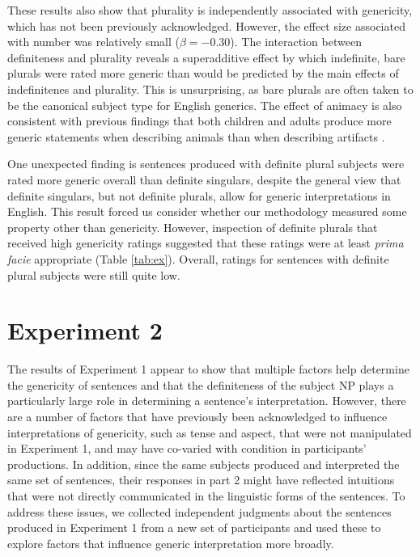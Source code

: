 \documentclass[10pt,letterpaper]{article}
\begin{document}
These results also show that plurality is independently associated with genericity, which has not been previously acknowledged. However, the effect size associated with number was relatively small (\(\beta = -0.30\)). The interaction between definiteness and plurality reveals a superadditive effect by which indefinite, bare plurals were rated more generic than would be predicted by the main effects of indefinitenes and plurality. This is unsurprising, as bare plurals are often taken to be the canonical subject type for English generics. The effect of animacy is also consistent with previous findings that both children and adults produce more generic statements when describing animals than when describing artifacts \cite{Brandone:2009}.

One unexpected finding is sentences produced with definite plural subjects were rated more generic overall than definite singulars, despite the general view that definite singulars, but not definite plurals, allow for generic interpretations in English. This result forced us consider whether our methodology measured some property other than genericity. However, inspection of definite plurals that received high genericity ratings suggested that these ratings were at least \emph{prima facie} appropriate (Table \ref{tab:ex}). Overall, ratings for sentences with definite plural subjects were still quite low.

\section{Experiment 2}

The results of Experiment 1 appear to show that multiple factors help determine the genericity of sentences and that the definiteness of the subject NP plays a particularly large role in determining a sentence's interpretation. However, there are a number of factors that have previously been acknowledged to influence interpretations of genericity, such as tense and aspect, that were not manipulated in Experiment 1, and may have co-varied with condition in participants' productions. In addition, since the same subjects produced and interpreted the same set of sentences, their responses in part 2 might have reflected intuitions that were not directly communicated in the linguistic forms of the sentences. To address these issues, we collected independent judgments about the sentences produced in Experiment 1 from a new set of participants and used these to explore factors that influence generic interpretation more broadly.
\end{document}
